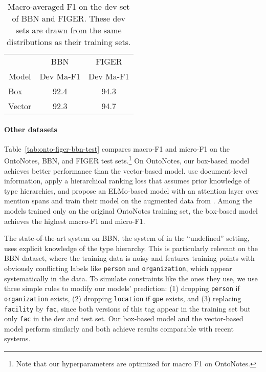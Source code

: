 \documentclass[11pt,a4paper]{article}
\begin{document}
\begin{table*}[t]
\begin{minipage}{.55\columnwidth}
\begin{tabular}{l c c}
		\toprule
		\multicolumn{1}{c}{} & \multicolumn{1}{c}{BBN} & \multicolumn{1}{c}{FIGER} \\
	    \cmidrule(r){2-2}  \cmidrule(r){3-3} 
		\multicolumn{1}{c}{Model}
		  & Dev Ma-F1 & Dev Ma-F1 \\
		\midrule
		Box & 92.4  & 94.3  \\
		Vector & 92.3  & 94.7  \\
		\bottomrule 
	\end{tabular}
	\caption{Macro-averaged F1 on the dev set of BBN and FIGER. These dev sets are drawn from the same distributions as their training sets.} \label{tab:dev-figer-bbn-test}
	\end{minipage}
	\vspace{-10pt}
\end{table*}

\paragraph{Other datasets} Table~\ref{tab:onto-figer-bbn-test} compares macro-F1 and micro-F1 on the OntoNotes, BBN, and FIGER test sets.\footnote{Note that our hyperparameters are optimized for macro F1 on OntoNotes.} On OntoNotes, our box-based model achieves better performance than the vector-based model. \citet{Sheng_Zhang_18} use document-level information, \citet{Tongfei_Chen_20} apply a hierarchical ranking loss that assumes prior knowledge of type hierarchies, and \citet{Ying_Lin_19} propose an ELMo-based model with an attention layer over mention spans and train their model on the augmented data from \citet{Eunsol_Choi_18}. Among the models trained only on the original OntoNotes training set, the box-based model achieves the highest macro-F1 and micro-F1.

The state-of-the-art system on BBN, the system of \citet{Tongfei_Chen_20} in the ``undefined'' setting, uses explicit knowledge of the type hierarchy. This is particularly relevant on the BBN dataset, where the training data is noisy and features training points with obviously conflicting labels like {\tt person} and {\tt organization}, which appear systematically in the data. To simulate constraints like the ones they use, we use three simple rules to modify our models' prediction: (1) dropping {\tt person} if {\tt organization} exists, (2) dropping {\tt location} if {\tt gpe} exists, and (3) replacing {\tt facility} by {\tt fac}, since both versions of this tag appear in the training set but only {\tt fac} in the dev and test set. Our box-based model and the vector-based model perform similarly and both achieve results comparable with recent systems.
\end{document}
